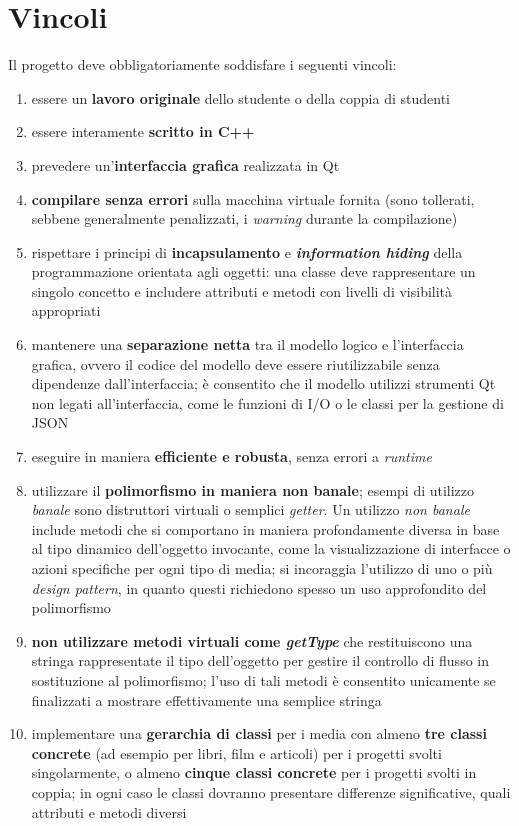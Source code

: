\documentclass[10pt,a4paper,oneside]{article}
\begin{document}
\section{Vincoli}
Il progetto deve obbligatoriamente soddisfare i seguenti vincoli:
\begin{enumerate}
 \item essere un \textbf{lavoro originale} dello studente o della coppia di studenti
 \item essere interamente \textbf{scritto in C++}
 \item prevedere un'\textbf{interfaccia grafica} realizzata in Qt
 \item \textbf{compilare senza errori} sulla macchina virtuale fornita (sono tollerati, sebbene generalmente penalizzati, i \emph{warning} durante la compilazione)
 \item rispettare i principi di \textbf{incapsulamento} e \textbf{\emph{information hiding}} della programmazione orientata agli oggetti: una classe deve rappresentare un singolo concetto e includere attributi e metodi con livelli di visibilità appropriati
 \item mantenere una \textbf{separazione netta} tra il modello logico e l'interfaccia grafica, ovvero il codice del modello deve essere riutilizzabile senza dipendenze dall'interfaccia; è consentito che il modello utilizzi strumenti Qt non legati all'interfaccia, come le funzioni di I/O o le classi per la gestione di JSON
 \item eseguire in maniera \textbf{efficiente e robusta}, senza errori a \emph{runtime}
 \item utilizzare il \textbf{polimorfismo in maniera non banale}; esempi di utilizzo \emph{banale} sono distruttori virtuali o semplici \emph{getter}. Un utilizzo \emph{non banale} include metodi che si comportano in maniera profondamente diversa in base al tipo dinamico dell'oggetto invocante, come la visualizzazione di interfacce o azioni specifiche per ogni tipo di media; si incoraggia l'utilizzo di uno o più \emph{design pattern}, in quanto questi richiedono spesso un uso approfondito del polimorfismo
 \item \textbf{non utilizzare metodi virtuali come \emph{getType}} che restituiscono una stringa rappresentate il tipo dell'oggetto per gestire il controllo di flusso in sostituzione al polimorfismo; l'uso di tali metodi è consentito unicamente se finalizzati a mostrare effettivamente una semplice stringa
 \item implementare una \textbf{gerarchia di classi} per i media con almeno \textbf{tre classi concrete} (ad esempio per libri, film e articoli) per i progetti svolti singolarmente, o almeno \textbf{cinque classi concrete} per i progetti svolti in coppia; in ogni caso le classi dovranno presentare differenze significative, quali attributi e metodi diversi

\end{enumerate}
\end{document}
